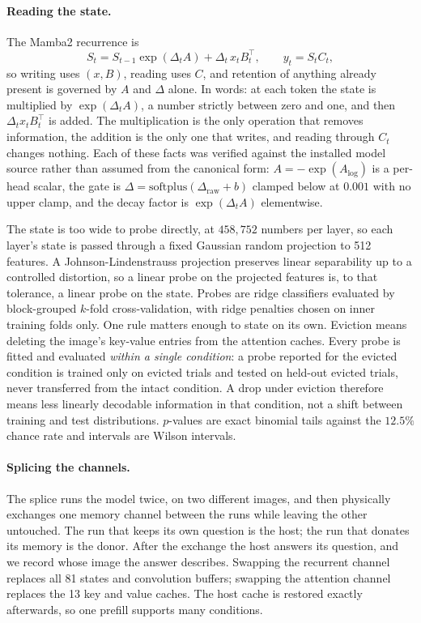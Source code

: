 \documentclass{article}
\begin{document}
\paragraph{Reading the state.} The Mamba2 recurrence is
\begin{equation}
S_t = S_{t-1}\exp(\Delta_t A) + \Delta_t\, x_t B_t^{\top},
\qquad y_t = S_t C_t ,
\end{equation}
so writing uses $(x, B)$, reading uses $C$, and retention of anything already
present is governed by $A$ and $\Delta$ alone. In words: at each token the
state is multiplied by $\exp(\Delta_t A)$, a number strictly between zero and
one, and then $\Delta_t x_t B_t^{\top}$ is added. The multiplication is the
only operation that removes information, the addition is the only one that
writes, and reading through $C_t$ changes nothing. Each of these facts was
verified against the installed model source rather than
assumed from the canonical form: $A = -\exp(A_{\log})$ is a per-head scalar,
the gate is $\Delta = \mathrm{softplus}(\Delta_{\text{raw}} + b)$ clamped
below at $0.001$ with no upper clamp, and the decay factor is
$\exp(\Delta_t A)$ elementwise.

The state is too wide to probe directly, at $458{,}752$ numbers per layer, so
each layer's state is passed through a fixed Gaussian random projection to 512
features. A Johnson-Lindenstrauss projection preserves linear separability up
to a controlled distortion, so a linear probe on the projected features is, to
that tolerance, a linear probe on the state. Probes are ridge classifiers
evaluated by block-grouped $k$-fold cross-validation, with ridge penalties
chosen on inner training folds only. One rule matters enough to state on its
own. Eviction means deleting the image's key-value entries from the attention
caches. Every probe is fitted and evaluated \emph{within a single condition}:
a probe reported for the evicted condition is trained only on evicted trials
and tested on held-out evicted trials, never transferred from the intact
condition. A drop under eviction therefore means less linearly decodable
information in that condition, not a shift between training and test
distributions. $p$-values are exact binomial
tails against the $12.5\%$ chance rate and intervals are Wilson intervals.

\paragraph{Splicing the channels.} The splice runs the model twice, on two
different images, and then physically exchanges one memory channel between the
runs while leaving the other untouched. The run that keeps its own question is
the host; the run that donates its memory is the donor. After the exchange the
host answers its question, and we record whose image the answer describes.
Swapping the recurrent channel replaces all 81 states and convolution buffers;
swapping the attention channel replaces the 13 key and value caches. The host
cache is restored exactly afterwards, so one prefill supports many conditions.
\end{document}
